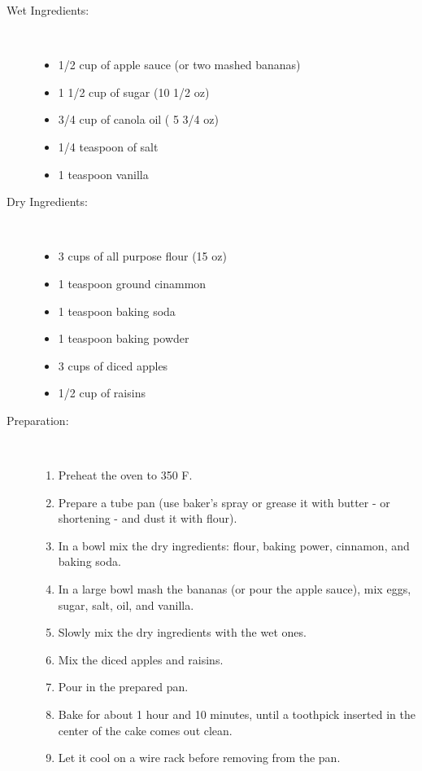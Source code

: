 \documentclass[11pt,letterpaper]{article}
\begin{document}


\begin{description}

\item[Wet Ingredients:]\  \newline
	\begin{itemize}
	\item 1/2 cup of apple sauce (or two mashed bananas)
	\item 1 1/2 cup of sugar (10 1/2 oz)
	\item 3/4 cup of canola oil ( 5 3/4 oz)
	\item 1/4 teaspoon of salt
	\item 1 teaspoon vanilla
	\end{itemize}

\item[Dry Ingredients:]\ \newline
	\begin{itemize}
	\item 3 cups of all purpose flour (15 oz)
	\item 1 teaspoon ground cinammon
	\item 1 teaspoon baking soda
	\item 1 teaspoon baking powder
	\item 3 cups of diced apples
	\item 1/2 cup of raisins
	\end{itemize}

\item[Preparation:]\ \newline
\begin{enumerate}
\item Preheat the oven to 350 F.
\item Prepare a tube pan (use baker's spray or grease it with butter - or
   shortening - and dust it with flour).
\item In a bowl mix the dry ingredients: flour, baking power, cinnamon,
   and baking soda.        
\item In a large bowl mash the bananas (or pour the apple sauce), mix eggs,
   sugar, salt, oil, and vanilla.
\item Slowly mix the dry ingredients with the wet ones.
\item Mix the diced apples and raisins.
\item Pour in the prepared pan.
\item Bake for about 1 hour and 10 minutes, until a toothpick inserted in
   the center of the cake comes out clean.
\item Let it cool on a wire rack before removing from the pan.
\end{enumerate}
\end{description}
\end{document}
